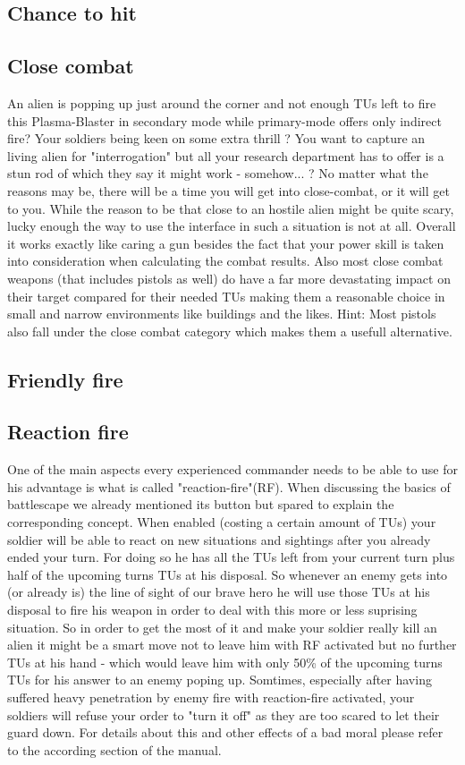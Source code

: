 \subsection{Chance to hit}



\subsection{Close combat }
An alien is popping up just around the corner and not enough TUs left to fire this Plasma-Blaster in secondary mode while primary-mode offers only indirect fire? Your soldiers being keen on some extra thrill ? You want to capture an living alien for "interrogation"   but all your research department has to offer is a stun rod of which they say it might work - somehow... ? No matter what the reasons may be, there will be a time you will get into close-combat, or it will get to you. While the reason to be that close to an hostile alien might be quite scary, lucky enough the way to use the interface in such a situation is not at all. Overall it works exactly like caring a gun besides the fact that your power skill is taken into consideration when calculating the combat results. Also most close combat weapons (that includes pistols as well) do have a far more devastating impact on their target compared for their needed TUs making them a reasonable choice in small and narrow environments like buildings and the likes. Hint: Most pistols also fall under the close combat category which makes them a usefull alternative.

\subsection{Friendly fire}


\subsection{Reaction fire}
One of the main aspects every experienced commander needs to be able to use for his advantage is what is called "reaction-fire"(RF). When discussing the basics of battlescape we already mentioned its button but spared to explain the corresponding concept. When enabled (costing a certain amount of TUs) your soldier will be able to react on new situations and sightings after you already ended your turn. For doing so he has all the TUs left from your current turn plus half of the upcoming turns TUs at his disposal. So whenever an enemy gets into (or already is) the line of sight of our brave hero he will use those TUs at his disposal to fire his weapon in order to deal with this more or less suprising situation. So in order to get the most of it and make your soldier really kill an alien it might be a smart move not to leave him with RF activated but no further TUs at his hand - which would leave him with only 50\% of the upcoming turns TUs for his answer to an enemy poping up. Somtimes, especially after having suffered heavy penetration by enemy fire with reaction-fire activated, your soldiers will refuse your order to "turn it off" as they are too scared to let their guard down. For details about this and other effects of a bad moral please refer to the according section of the manual.

